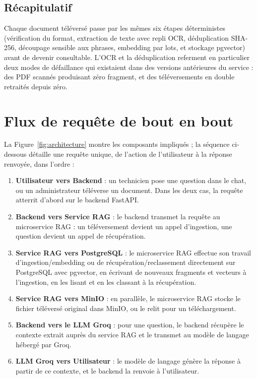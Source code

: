 \subsection{Récapitulatif}

Chaque document téléversé passe par les mêmes six étapes déterministes (vérification du format, extraction de texte avec repli OCR, déduplication SHA-256, découpage sensible aux phrases, embedding par lots, et stockage pgvector) avant de devenir consultable. L'OCR et la déduplication referment en particulier deux modes de défaillance qui existaient dans des versions antérieures du service : des PDF scannés produisant zéro fragment, et des téléversements en double retraités depuis zéro.

\section{Flux de requête de bout en bout}

La Figure~\ref{fig:architecture} montre les composants impliqués ; la séquence ci-dessous détaille une requête unique, de l'action de l'utilisateur à la réponse renvoyée, dans l'ordre :

\begin{enumerate}
\item \textbf{Utilisateur vers Backend} : un technicien pose une question dans le chat, ou un administrateur téléverse un document. Dans les deux cas, la requête atterrit d'abord sur le backend FastAPI.
\item \textbf{Backend vers Service RAG} : le backend transmet la requête au microservice RAG : un téléversement devient un appel d'ingestion, une question devient un appel de récupération.
\item \textbf{Service RAG vers PostgreSQL} : le microservice RAG effectue son travail d'ingestion/embedding ou de récupération/reclassement directement sur PostgreSQL avec pgvector, en écrivant de nouveaux fragments et vecteurs à l'ingestion, en les lisant et en les classant à la récupération.
\item \textbf{Service RAG vers MinIO} : en parallèle, le microservice RAG stocke le fichier téléversé original dans MinIO, ou le relit pour un téléchargement.
\item \textbf{Backend vers le LLM Groq} : pour une question, le backend récupère le contexte extrait auprès du service RAG et le transmet au modèle de langage hébergé par Groq.
\item \textbf{LLM Groq vers Utilisateur} : le modèle de langage génère la réponse à partir de ce contexte, et le backend la renvoie à l'utilisateur.
\end{enumerate}

